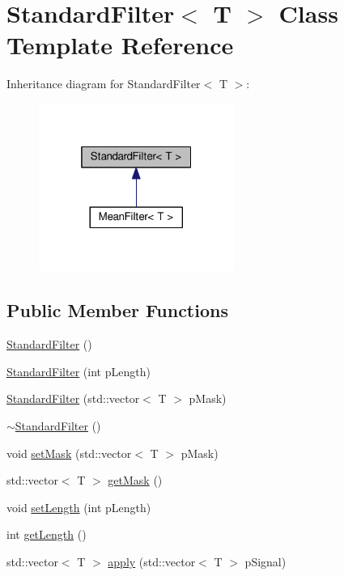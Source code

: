 \hypertarget{class_standard_filter}{}\section{Standard\+Filter$<$ T $>$ Class Template Reference}
\label{class_standard_filter}


Inheritance diagram for Standard\+Filter$<$ T $>$\+:\nopagebreak
\begin{figure}[H]
\begin{center}
\leavevmode
\includegraphics[width=181pt]{class_standard_filter__inherit__graph}
\end{center}
\end{figure}
\subsection*{Public Member Functions}
\begin{DoxyCompactItemize}
\item 
\hyperlink{class_standard_filter_a7ccdce74856a1bdfa877bcec14b5c98b}{Standard\+Filter} ()
\item 
\hyperlink{class_standard_filter_acbc237007e90073c4306e748d73d7eaf}{Standard\+Filter} (int p\+Length)
\item 
\hyperlink{class_standard_filter_a380828493a181b61010bb633538b0e7c}{Standard\+Filter} (std\+::vector$<$ T $>$ p\+Mask)
\item 
\hyperlink{class_standard_filter_a748eb93b291c9f50496015f3c07069a0}{$\sim$\+Standard\+Filter} ()
\item 
void \hyperlink{class_standard_filter_abef27f90eea94d34607e24dd026a281e}{set\+Mask} (std\+::vector$<$ T $>$ p\+Mask)
\item 
std\+::vector$<$ T $>$ \hyperlink{class_standard_filter_ab511fb0167d038d75cba52dd936eddd3}{get\+Mask} ()
\item 
void \hyperlink{class_standard_filter_af441d21022cd441f08421de8cd714d53}{set\+Length} (int p\+Length)
\item 
int \hyperlink{class_standard_filter_ae993492384d41dc26c5f5577607b3b02}{get\+Length} ()
\item 
std\+::vector$<$ T $>$ \hyperlink{class_standard_filter_a2b6a11ed970216b26bda63857d4ed1fc}{apply} (std\+::vector$<$ T $>$ p\+Signal)
\end{DoxyCompactItemize}
